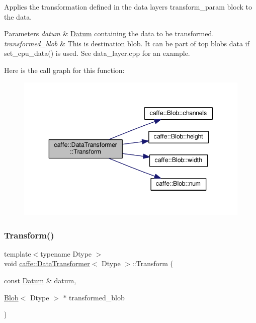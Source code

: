 Applies the transformation defined in the data layer\textquotesingle{}s transform\+\_\+param block to the data. 


\begin{DoxyParams}{Parameters}
{\em datum} & \mbox{\hyperlink{classcaffe_1_1_datum}{Datum}} containing the data to be transformed. \\
\hline
{\em transformed\+\_\+blob} & This is destination blob. It can be part of top blob\textquotesingle{}s data if set\+\_\+cpu\+\_\+data() is used. See data\+\_\+layer.\+cpp for an example. \\
\hline
\end{DoxyParams}
Here is the call graph for this function\+:
\nopagebreak
\begin{figure}[H]
\begin{center}
\leavevmode
\includegraphics[width=343pt]{classcaffe_1_1_data_transformer_a1626db49587d506a91e7b70373ace816_cgraph}
\end{center}
\end{figure}
\mbox{\label{classcaffe_1_1_data_transformer_a1626db49587d506a91e7b70373ace816}} 
\subsubsection{\texorpdfstring{Transform()}{Transform()}\hspace{0.1cm}{\footnotesize\ttfamily [2/6]}}
{\footnotesize\ttfamily template$<$typename Dtype $>$ \\
void \mbox{\hyperlink{classcaffe_1_1_data_transformer}{caffe\+::\+Data\+Transformer}}$<$ Dtype $>$\+::Transform (\begin{DoxyParamCaption}\item[{const \mbox{\hyperlink{classcaffe_1_1_datum}{Datum}} \&}]{datum,  }\item[{\mbox{\hyperlink{classcaffe_1_1_blob}{Blob}}$<$ Dtype $>$ $\ast$}]{transformed\+\_\+blob }\end{DoxyParamCaption})}



